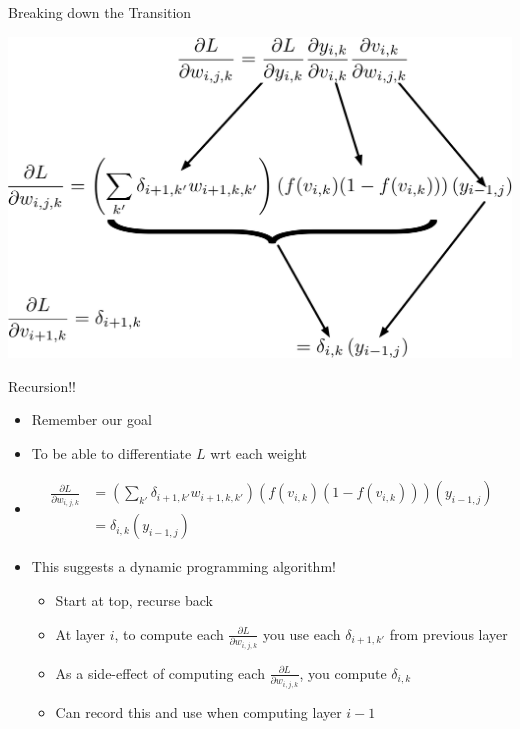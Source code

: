 \documentclass[aspectratio=169]{beamer}
\begin{document}
\begin{frame}{Breaking down the Transition}
\begin{center}
\includegraphics[width=.75\textwidth]{lectBP/delta.pdf}
\end{center}\end{frame}
\begin{frame}{Recursion!!}
\begin{itemize}
\item Remember our goal
	\item To be able to differentiate $L$ wrt each weight
	\item[]
	\begin{align} \frac{\partial L}{\partial w_{i,j,k}} &= 
		\left( \sum_{k'} \delta_{i+1,k'} w_{i+1,k,k'} \right)  
		\left( f(v_{i,k})(1 - f(v_{i,k})) \right)
			\left( y_{i-1,j} \right) \nonumber \\	
		&= \delta_{i,k} \left( y_{i-1,j} \right) \nonumber \end{align}
	\item This suggests a dynamic programming algorithm!
	\begin{itemize}
	\item Start at top, recurse back
	\item At layer $i$, to compute each $\frac{\partial L}{\partial w_{i,j,k}}$
		you use each $\delta_{i+1,k'}$ from previous layer
	\item As a side-effect of computing each $\frac{\partial L}{\partial w_{i,j,k}}$, you compute
		$\delta_{i,k}$
	\item Can record this and use when computing layer $i-1$ 
	\end{itemize}
\end{itemize}
\end{frame}
\end{document}
